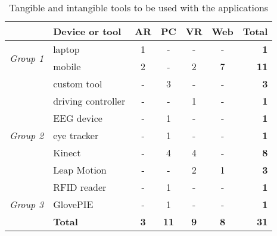 \documentclass[utf8,english]{gradu3}
\begin{document}
\begin{table}[h]
  \centering
  \begin{tabular}{|c|p{3cm}|c|c|c|c|>{\bfseries}r|}
    \hline
                                      & \textbf{Device or tool} & \textbf{AR} & \textbf{PC} & \textbf{VR} & \textbf{Web} & Total \\ \hline
    \multirow{2}{*}{\textit{Group 1}} & laptop                  & 1           & -           & -           & -            & 1     \\
                                      & mobile                  & 2           & -           & 2           & 7            & 11    \\ \hline
    \multirow{7}{*}{\textit{Group 2}} & custom tool             & -           & 3           & -           & -            & 3     \\
                                      & driving controller      & -           & -           & 1           & -            & 1     \\
                                      & EEG device              & -           & 1           & -           & -            & 1     \\
                                      & eye tracker             & -           & 1           & -           & -            & 1     \\
                                      & Kinect                  & -           & 4           & 4           & -            & 8     \\
                                      & Leap Motion             & -           & -           & 2           & 1            & 3     \\
                                      & RFID reader             & -           & 1           & -           & -            & 1     \\ \hline
    \textit{Group 3}                  & GlovePIE                & -           & 1           & -           & -            & 1     \\ \hline
                                      & \textbf{Total}          & \textbf{3}  & \textbf{11} & \textbf{9}  & \textbf{8}   & 31    \\ \hline
  \end{tabular}
  \caption{Tangible and intangible tools to be used with the applications}
  \label{tools}
\end{table}
\end{document}
